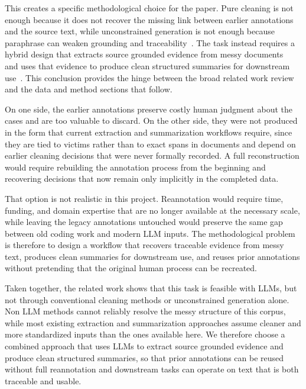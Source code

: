 \documentclass{article}
\begin{document}
This creates a specific methodological choice for the paper. Pure cleaning is not enough because it does not recover the missing link between earlier annotations and the source text, while unconstrained generation is not enough because paraphrase can weaken grounding and traceability~\cite{Brandt_etal2025}. The task instead requires a hybrid design that extracts source grounded evidence from messy documents~\cite{Dagdelen_etal2024} and uses that evidence to produce clean structured summaries for downstream use~\cite{olsen-etal-2024-socio}. This conclusion provides the hinge between the broad related work review and the data and method sections that follow.


On one side, the earlier annotations preserve costly human judgment about the cases and are too valuable to discard. On the other side, they were not produced in the form that current extraction and summarization workflows require, since they are tied to victims rather than to exact spans in documents and depend on earlier cleaning decisions that were never formally recorded. A full reconstruction would require rebuilding the annotation process from the beginning and recovering decisions that now remain only implicitly in the completed data.

That option is not realistic in this project. Reannotation would require time, funding, and domain expertise that are no longer available at the necessary scale, while leaving the legacy annotations untouched would preserve the same gap between old coding work and modern LLM inputs. The methodological problem is therefore to design a workflow that recovers traceable evidence from messy text, produces clean summaries for downstream use, and reuses prior annotations without pretending that the original human process can be recreated.

Taken together, the related work shows that this task is feasible with LLMs, but not through conventional cleaning methods or unconstrained generation alone. Non LLM methods cannot reliably resolve the messy structure of this corpus, while most existing extraction and summarization approaches assume cleaner and more standardized inputs than the ones available here. We therefore choose a combined approach that uses LLMs to extract source grounded evidence and produce clean structured summaries, so that prior annotations can be reused without full reannotation and downstream tasks can operate on text that is both traceable and usable.
\end{document}
